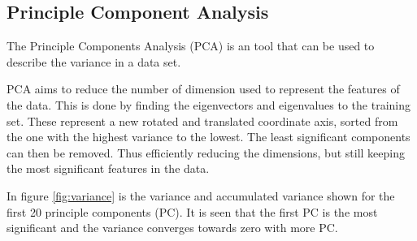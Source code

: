 \subsection{Principle Component Analysis}
The Principle Components Analysis (PCA) is an tool that can be used to describe the variance in a data set.

PCA aims to reduce the number of dimension used to represent the features of the data.
This is done by finding the eigenvectors and eigenvalues to the training set.
These represent a new rotated and translated coordinate axis, sorted from the one with the highest variance to the lowest.
The least significant components can then be removed.
Thus efficiently reducing the dimensions, but still keeping the most significant features in the data.

In figure \ref{fig:variance} is the variance and accumulated variance shown for the first 20 principle components (PC). 
It is seen that the first PC is the most significant and the variance converges towards zero with more PC.

